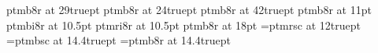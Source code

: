 %
%   
%
%
\newif\ifletteredindex\letteredindexfalse
%
\newif\ifromanintro
\ifx\romanintro\FALSE\romanintrofalse\else
\ifx\romanintro\TRUE\romanintrotrue\else\romanintrotrue\fi\fi
%
%
%
%
%
\makeatletter
\def\\{\let\stoken= } \\
\long\def\unexpandedwrite#1#2{\def\finwrite{\immediate\write#1}%
  {\aftergroup\finwrite\aftergroup{\s@nitize#2\endsanity}}}
\def\s@nitize{\futurelet\next\sanswitch}
\def\sanswitch{\let\n@xt\endsanity \ifx\next\endsanity
  \else\ifcat\noexpand\next\stoken\aftergroup\space\let\n@xt=\eat
   \else\ifcat\noexpand\next\bgroup\aftergroup{\let\n@xt=\eat
    \else\ifcat\noexpand\next\egroup\aftergroup}\let\n@xt=\eat
     \else\let\n@xt=\copytok\fi\fi\fi\fi \n@xt}
\def\eat{\afterassignment\s@nitize \let\next= }
\long\def\copytok#1{\ifcat\noexpand#1\relax\aftergroup\noexpand\fi
  \ifcat\noexpand#1\noexpand~\aftergroup\noexpand\fi
  \aftergroup#1\s@nitize}
\def\endsanity\endsanity{}
\makeatother
%
%
\ifamsfonts
\fi                  %
%
\iftimes









%
\else  %
%






\fi
%
\iftimes
\font\booktitlefont ptmb8r at 29truept
\let\booksubtitlefont\elevenit
\font\chaptitlefont ptmb8r at 24truept
\font\chapnumberfont ptmb8r at 42truept
\font\pagenofont ptmb8r at 11pt
\font\prooffont ptmbi8r at 10.5pt
\font\remarksfont ptmri8r at 10.5pt
\font\ctscnfont ptmb8r at 18pt
\let\authorfont\ctscnfont
\font\scfont=ptmrsc at 12truept
\font\bscfont=ptmbsc at 14.4truept
\font\secfontmathrm=ptmb8r at 14.4truept
